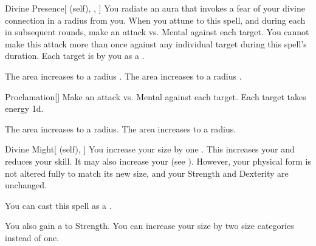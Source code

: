 \lowercase{\hypertarget{spell:Divine Presence}{}}\label{spell:Divine Presence}
\begin{attuneability}[Rank 3]{\hypertarget{spell:Divine Presence}{Divine Presence}}[ (self), , ]
You radiate an aura that invokes a fear of your divine connection in a \areamed radius  from you.
When you attune to this spell, and during each  in subsequent rounds, make an attack vs. Mental against each target.
You cannot make this attack more than once against any individual target during this spell's duration.
\hit Each target is  by you as a .

\rankline
{} The area increases to a \arealarge radius .
 The area increases to a \areahuge radius .
\end{attuneability}
\vspace{0.25em}



\lowercase{\hypertarget{spell:Proclamation}{}}\label{spell:Proclamation}
\begin{freeability}[Rank 3]{\hypertarget{spell:Proclamation}{Proclamation}}[]
Make an attack vs. Mental against each target.
\hit Each target takes energy  \minus1d.

\rankline
{} The area increases to a \arealarge radius.
 The area increases to a \areahuge radius.
\end{freeability}
\vspace{0.25em}



\lowercase{\hypertarget{spell:Divine Might}{}}\label{spell:Divine Might}
\begin{attuneability}[Rank 4]{\hypertarget{spell:Divine Might}{Divine Might}}[ (self), ]
You increase your size by one .
This increases your  and reduces your  skill.
It may also increase your  (see ).
However, your physical form is not altered fully to match its new size, and your Strength and Dexterity are unchanged.

You can cast this spell as a .

\rankline
{} You also gain a   to Strength.
 You can increase your size by two size categories instead of one.
\end{attuneability}
\vspace{0.25em}



